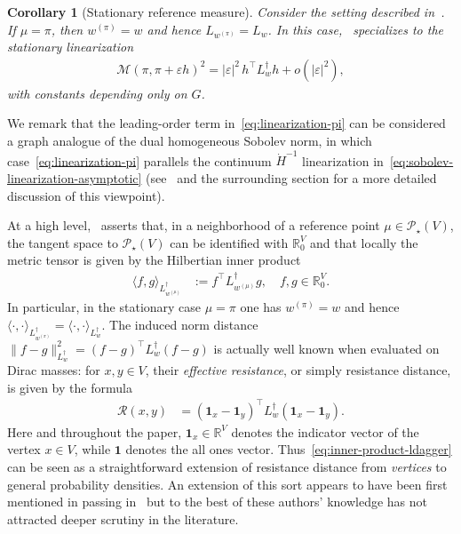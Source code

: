 \documentclass[11pt,a4paper]{article}
\newcommand{\Maas}{\mathcal{M}}
\newcommand{\Resis}{\mathcal{R}}
\newcommand{\Prob}{\mathscr{P}}
\newtheorem{corollary}[theorem]{Corollary}
\begin{document}
\begin{corollary}[Stationary reference measure]
    Consider the setting described in~. If $\mu=\pi$, then $w^{(\pi)}=w$ and hence $L_{w^{(\pi)}}=L_w$. In this case,~ specializes to the stationary linearization
        \begin{align}\label{eq:linearization-pi}
            \Maas(\pi,\pi+\varepsilon h)^2 = |\varepsilon|^2 \, h^\top L_{w}^{\dagger} h + o(|\varepsilon|^2),
        \end{align}
    with constants depending only on $G$.
\end{corollary}

We remark that the leading-order term in~\cref{eq:linearization-pi} can be considered a graph analogue of the dual homogeneous Sobolev norm, in which case~\cref{eq:linearization-pi} parallels the continuum $\dot H^{-1}$ linearization in~\cref{eq:sobolev-linearization-asymptotic} (see~ and the surrounding section for a more detailed discussion of this viewpoint). 

At a high level,~ asserts that, in a neighborhood of a reference point $\mu\in\Prob_\star(V)$, the tangent space to $\Prob_\star(V)$ can be identified with $\mathbb{R}^{V}_0$ and that locally the metric tensor is given by the Hilbertian inner product
    \begin{align}\label{eq:inner-product-ldagger}
        \langle f, g\rangle_{L_{w^{(\mu)}}^{\dagger}} &:= f^\top L_{w^{(\mu)}}^{\dagger} g,\quad f, g\in\mathbb{R}^{V}_0.
    \end{align}
In particular, in the stationary case $\mu=\pi$ one has $w^{(\pi)}=w$ and hence $\langle\cdot,\cdot\rangle_{L_{w^{(\pi)}}^{\dagger}}=\langle\cdot,\cdot\rangle_{L_w^{\dagger}}$. The induced norm distance $\|f-g\|_{L_{w}^{\dagger}}^2 = (f-g)^\top L_{w}^{\dagger} (f-g)$ is actually well known when evaluated on Dirac masses: for $x,y\in V$, their \emph{effective resistance}, or simply resistance distance, is given by the formula
    \begin{align}\label{eq:resistance-distance-vertices}
        \Resis (x, y) &= (\mathbf{1}_x-\mathbf{1}_y)^\top L_w^\dagger (\mathbf{1}_x-\mathbf{1}_y).
    \end{align}
Here and throughout the paper, $\mathbf{1}_x\in\mathbb{R}^{V}$ denotes the indicator vector of the vertex $x\in V$, while $\mathbf{1}$ denotes the all ones vector. Thus~\cref{eq:inner-product-ldagger} can be seen as a straightforward extension of resistance distance from \emph{vertices} to general probability densities. An extension of this sort appears to have been first mentioned in passing in~\cite{jorgensen2010hilbert} but to the best of these authors' knowledge has not attracted deeper scrutiny in the literature.
\end{document}
